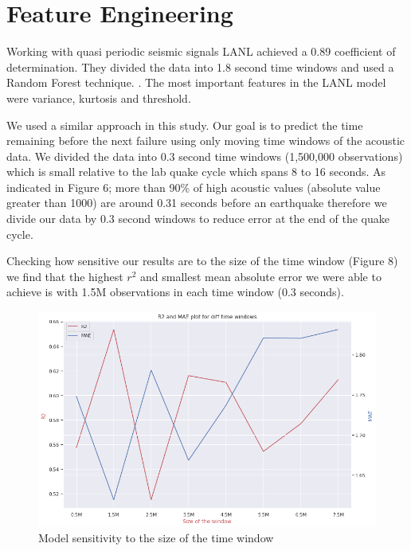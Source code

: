 \documentclass[]{llncs} %
\begin{document}
\section{Feature Engineering}
Working with quasi periodic seismic signals LANL achieved a 0.89 coefficient of determination. They divided the data into 1.8 second time windows and used a Random Forest technique. \cite{Bertrand}. The most important features in the LANL model were variance, kurtosis and threshold. \par
We used a similar approach in this study. Our goal is to predict the time remaining before the next failure using only moving time windows of the acoustic data. We divided the data into 0.3 second time windows (1,500,000 observations) which is small relative to the lab quake cycle which spans 8 to 16 seconds. As indicated in Figure 6; more than 90\% of high acoustic values (absolute value greater than 1000) are around 0.31 seconds before an earthquake therefore we divide our data by 0.3 second windows to reduce error at the end of the quake cycle. \par
Checking how sensitive our results are to the size of the time window (Figure 8) we find that the highest $r^2$ and smallest mean absolute error we were able to achieve is with 1.5M observations in each time window (0.3 seconds). \par
\begin{figure}
	\centering
	\includegraphics[width=.9\linewidth]{rSquaredandMAE}
	\caption{Model sensitivity to the size of the time window}
	\label{fig:rSquaredandMAE}
\end{figure}
\end{document}
